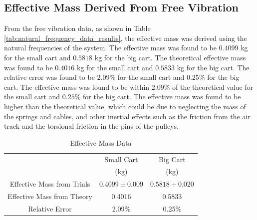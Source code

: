\subsection{Effective Mass Derived From Free Vibration}
From the free vibration data, as shown in Table \ref{tab:natural_frequency_data_results}, the effective mass was derived using the natural frequencies of the system. The effective mass was found to be $0.4099$ kg for the small cart and $0.5818$ kg for the big cart. The theoretical effective mass was found to be $0.4016$ kg for the small cart and $0.5833$ kg for the big cart. The relative error was found to be $2.09\%$ for the small cart and $0.25\%$ for the big cart. The effective mass was found to be within $2.09\%$ of the theoretical value for the small cart and $0.25\%$ for the big cart. The effective mass was found to be higher than the theoretical value, which could be due to neglecting the mass of the springs and cables, and other inertial effects such as the friction from the air track and the torsional friction in the pins of the pulleys.
\begin{table}[H]
    \centering
    \caption{Effective Mass Data}
    \label{tab:effective_mass_data_for_effective_mass_results}
    \begin{tabular}{ccc}
    \toprule
        & Small Cart & Big Cart \\
        & (kg) & (kg) \\
        \midrule
        Effective Mass from Trials & $0.4099 \pm 0.009$ & $0.5818 + 0.020$ \\
        Effective Mass from Theory & 0.4016 & 0.5833 \\
        \midrule 
        Relative Error & 2.09\% & 0.25\% \\
        \bottomrule
    \end{tabular}
\end{table}